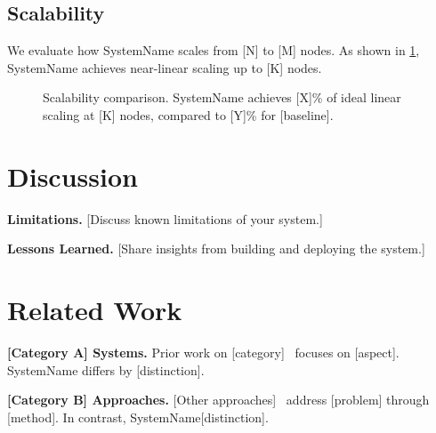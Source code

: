 \documentclass[letterpaper,twocolumn,10pt]{article}
\newcommand{\system}{SystemName\xspace}
\newcommand{\para}[1]{\smallskip\noindent\textbf{#1.}}
\begin{document}
\subsection{Scalability}
\label{sec:eval:scale}

We evaluate how \system scales from [N] to [M] nodes.
As shown in \cref{fig:scalability}, \system achieves near-linear
scaling up to [K] nodes.

\begin{figure}[t]
  \centering
  \caption{Scalability comparison. \system achieves [X]\% of ideal
    linear scaling at [K] nodes, compared to [Y]\% for [baseline].}
  \label{fig:scalability}
\end{figure}

\section{Discussion}
\label{sec:discussion}


\para{Limitations}
[Discuss known limitations of your system.]

\para{Lessons Learned}
[Share insights from building and deploying the system.]

\section{Related Work}
\label{sec:related}


\para{[Category A] Systems}
Prior work on [category]~\cite{dean2004mapreduce, abadi2016tensorflow}
focuses on [aspect]. \system differs by [distinction].

\para{[Category B] Approaches}
[Other approaches]~\cite{lamport1978time, verma2015borg} address [problem]
through [method]. In contrast, \system [distinction].

\end{document}
